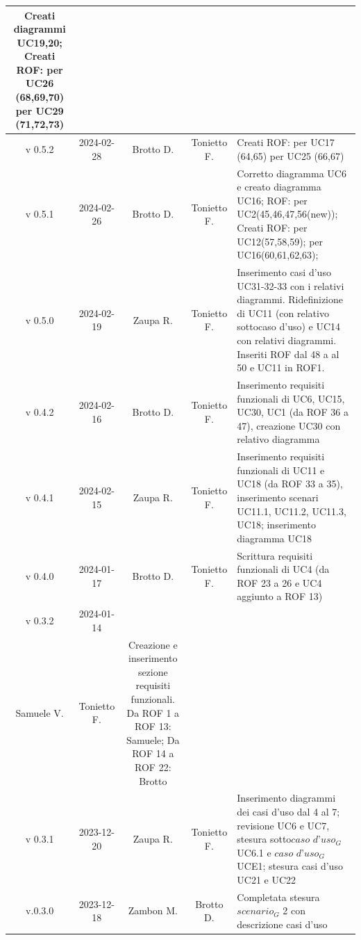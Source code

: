 \documentclass[12pt, oneside]{article}
\begin{document}
\begin{longtable}{|c|c|c|c|p{7cm}|}
\newline Creati diagrammi UC19,20;
\newline Creati ROF:
\newline per UC26 (68,69,70)
\newline per UC29 (71,72,73)
\\
\hline
v 0.5.2 & 2024-02-28 & Brotto D. & Tonietto F. & Creati ROF:
\newline per UC17 (64,65) 
\newline per UC25 (66,67)
\\
\hline
v 0.5.1 & 2024-02-26 & Brotto D. & Tonietto F. & Corretto diagramma UC6 e creato diagramma UC16; \newline ROF: per UC2(45,46,47,56(new)); 
\newline Creati ROF: \newline per UC12(57,58,59); \newline per UC16(60,61,62,63); \\
\hline
v 0.5.0 & 2024-02-19 & Zaupa R. & Tonietto F. & Inserimento casi d'uso UC31-32-33 con i relativi diagrammi. Ridefinizione di UC11 (con relativo sottocaso d'uso) e UC14 con relativi diagrammi. Inseriti ROF dal 48 a al 50 e UC11 in ROF1. \\
\hline
v 0.4.2 & 2024-02-16 & Brotto D. & Tonietto F. & Inserimento requisiti funzionali di UC6, UC15, UC30, UC1 (da ROF 36 a 47), creazione UC30 con relativo diagramma \\
\hline
v 0.4.1 & 2024-02-15 & Zaupa R. & Tonietto F. & Inserimento requisiti funzionali di UC11 e UC18 (da ROF 33 a 35), inserimento scenari UC11.1, UC11.2, UC11.3, UC18; inserimento diagramma UC18 \\
\hline
v 0.4.0 & 2024-01-17 & Brotto D. & Tonietto F. & Scrittura requisiti funzionali di UC4 (da ROF 23 a 26 e UC4 aggiunto a ROF 13) \\
\hline
v 0.3.2 & 2024-01-14 & 
\begin{tabular}[c]{@{}c@{}}
    Davide B. \\
    Samuele V.
  \end{tabular} 
& Tonietto F. & Creazione e inserimento sezione requisiti funzionali. Da ROF 1 a ROF 13: Samuele; Da ROF 14 a ROF 22: Brotto\\
\hline
v 0.3.1 & 2023-12-20 & Zaupa R. & Tonietto F. & Inserimento diagrammi dei casi d'uso dal 4 al 7; revisione  UC6 e UC7, stesura sotto$\textit{caso d'uso}_G$ UC6.1 e $\textit{caso d'uso}_G$ UCE1; stesura casi d'uso UC21 e UC22 \\
\hline
v.0.3.0 & 2023-12-18 & Zambon M. & Brotto D. & Completata stesura $\textit{scenario}_G$ 2 con descrizione casi d'uso \\

\end{longtable}
\end{document}
